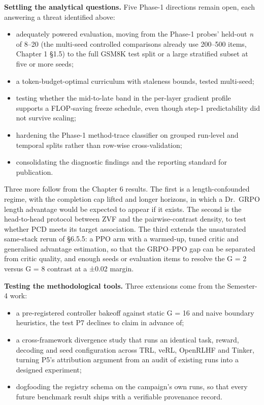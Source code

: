 \documentclass[12pt,a4paper]{report}
\providecommand{\tightlist}{%
  \setlength{\itemsep}{0pt}\setlength{\parskip}{0pt}}
\begin{document}
\textbf{Settling the analytical questions.} Five Phase-1 directions
remain open, each answering a threat identified above:

\begin{itemize}
\tightlist
\item
  adequately powered evaluation, moving from the Phase-1 probes'
  held-out \emph{n} of 8--20 (the multi-seed controlled comparisons
  already use 200--500 items, Chapter 1 §1.5) to the full GSM8K test
  split or a large stratified subset at five or more seeds;
\item
  a token-budget-optimal curriculum with staleness bounds, tested
  multi-seed;
\item
  testing whether the mid-to-late band in the per-layer gradient profile
  supports a FLOP-saving freeze schedule, even though step-1
  predictability did not survive scaling;
\item
  hardening the Phase-1 method-trace classifier on grouped run-level and
  temporal splits rather than row-wise cross-validation;
\item
  consolidating the diagnostic findings and the reporting standard for
  publication.
\end{itemize}

Three more follow from the Chapter 6 results. The first is a
length-confounded regime, with the completion cap lifted and longer
horizons, in which a Dr.~GRPO length advantage would be expected to
appear if it exists. The second is the head-to-head protocol between ZVF
and the pairwise-contrast density, to test whether PCD meets its target
association. The third extends the unsaturated same-stack rerun of
§6.5.5: a PPO arm with a warmed-up, tuned critic and generalised
advantage estimation, so that the GRPO--PPO gap can be separated from
critic quality, and enough seeds or evaluation items to resolve the G =
2 versus G = 8 contrast at a ±0.02 margin.

\textbf{Testing the methodological tools.} Three extensions come from
the Semester-4 work:

\begin{itemize}
\tightlist
\item
  a pre-registered controller bakeoff against static G = 16 and naive
  boundary heuristics, the test P7 declines to claim in advance of;
\item
  a cross-framework divergence study that runs an identical task,
  reward, decoding and seed configuration across TRL, veRL, OpenRLHF and
  Tinker, turning P5's attribution argument from an audit of existing
  runs into a designed experiment;
\item
  dogfooding the registry schema on the campaign's own runs, so that
  every future benchmark result ships with a verifiable provenance
  record.
\end{itemize}
\end{document}
